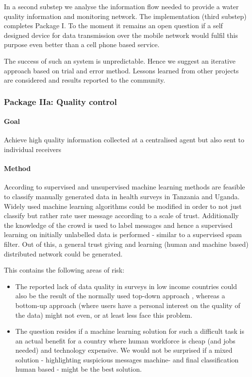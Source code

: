 \documentclass[11pt]{article}
\begin{document}
In a second substep we analyse the information flow needed to provide a water quality information and monitoring network. The implementation (third substep) completes Package I. To the moment it remains an open question if a self designed device for data transmission over the mobile network would fulfil this purpose even better than a cell phone based service. 

The success of such an system is unpredictable. Hence we suggest an iterative approach based on trial and error method. Lessons learned from other projects are considered and results reported to the community.



\subsubsection*{Package IIa: Quality control}
\paragraph{Goal} Achieve high quality information collected at a centralised agent but also sent to individual receivers 
\paragraph{Method} According to \cite{birnbaum2012automated} supervised and unsupervised machine learning methods are feasible to classify manually generated data in health surveys in Tanzania and Uganda. Widely used machine learning algorithms could be modified in order to not just classify but rather rate user message according to a scale of trust. Additionally the knowledge of the crowd is used to label messages and hence a  supervised learning on initially unlabelled data is performed - similar to a supervised spam filter. Out of this, a general trust giving and learning (human and machine based) distributed network could be generated.

This contains the following areas of risk:

\begin{itemize}
 \item The reported lack of data quality in surveys in low income countries could also be the result of the normally used top-down approach \cite{birnbaum2012automated}, whereas a bottom-up approach  (where users have a personal interest on the quality of the data) might not even, or at least less face this problem.
 \item The question resides if a machine learning solution for such a difficult task is an actual benefit for a country where human workforce is cheap (and jobs needed) and technology expensive. We would not be surprised if a mixed solution - highlighting suspicious messages machine- and final classification human based - might be the best solution.
\end{itemize}
\end{document}

